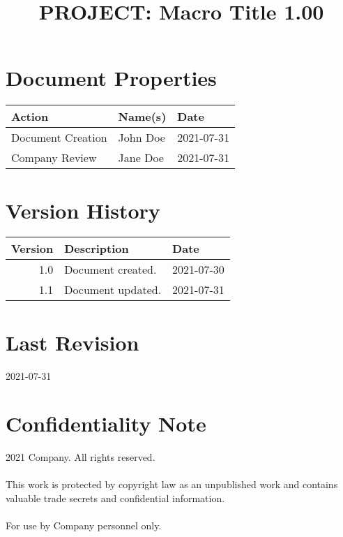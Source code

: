 \documentclass[10pt,a4paper]{hitec}
\title{PROJECT: Macro Title 1.00}
\date{}
\begin{document}
\maketitle

\section*{Document Properties}

\begin{tabular}{ | l | l | l |}
\hline
\textbf{Action} & \textbf{Name(s)} & \textbf{Date} \\ \hline
Document Creation & John Doe & 2021-07-31 \\ \hline
Company Review & Jane Doe & 2021-07-31 \\
\hline
\end{tabular}

\section*{Version History}

\begin{tabular}{ | r | p{5cm} | l |}
\hline
\textbf{Version} & \textbf{Description} & \textbf{Date} \\ \hline
1.0 & Document created. & 2021-07-30 \\ \hline %
1.1 & Document updated. & 2021-07-31 \\
\hline
\end{tabular}


\section*{Last Revision}

2021-07-31

\section*{Confidentiality Note}

2021 Company. All rights reserved.\\
\\
This work is protected by copyright law as an unpublished work and contains valuable trade secrets and confidential information.\\
\\
For use by Company personnel only.

\newpage

\tableofcontents
\end{document}
